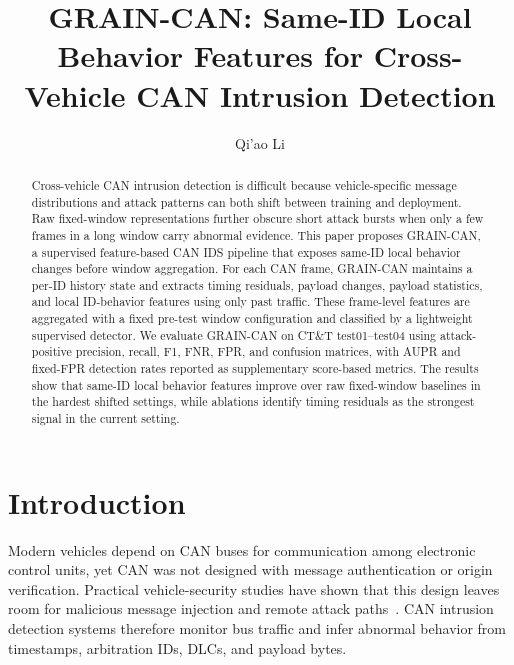 \documentclass[runningheads]{llncs}
\newcommand{\method}{GRAIN-CAN}
\begin{document}
\raggedbottom
\title{\method{}: Same-ID Local Behavior Features for Cross-Vehicle CAN Intrusion Detection}
\titlerunning{\method{}}
\author{Qi'ao Li}
\maketitle
\begin{abstract}
Cross-vehicle CAN intrusion detection is difficult because vehicle-specific message distributions and attack patterns can both shift between training and deployment. Raw fixed-window representations further obscure short attack bursts when only a few frames in a long window carry abnormal evidence. This paper proposes \method{}, a supervised feature-based CAN IDS pipeline that exposes same-ID local behavior changes before window aggregation. For each CAN frame, \method{} maintains a per-ID history state and extracts timing residuals, payload changes, payload statistics, and local ID-behavior features using only past traffic. These frame-level features are aggregated with a fixed pre-test window configuration and classified by a lightweight supervised detector. We evaluate \method{} on CT\&T test01--test04 using attack-positive precision, recall, F1, FNR, FPR, and confusion matrices, with AUPR and fixed-FPR detection rates reported as supplementary score-based metrics. The results show that same-ID local behavior features improve over raw fixed-window baselines in the hardest shifted settings, while ablations identify timing residuals as the strongest signal in the current setting.
\end{abstract}

\section{Introduction}
Modern vehicles depend on CAN buses for communication among electronic control units, yet CAN was not designed with message authentication or origin verification. Practical vehicle-security studies have shown that this design leaves room for malicious message injection and remote attack paths~\cite{koscher2010experimental,checkoway2011comprehensive,miller2015remote}. CAN intrusion detection systems therefore monitor bus traffic and infer abnormal behavior from timestamps, arbitration IDs, DLCs, and payload bytes.
\end{document}
